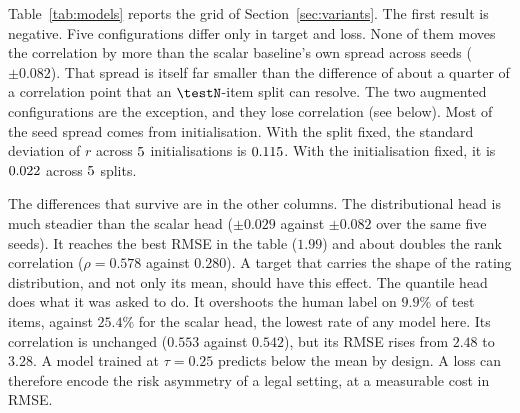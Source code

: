 \documentclass{BVP_JCLLT}
\newcommand{\rev}[1]{#1}
\newcommand{\rev}[1]{{\color{revcol}#1}}
\begin{document}
\rev{Table~\ref{tab:models} reports the grid of Section~\ref{sec:variants}. The
first result is negative. Five configurations differ only in
target and loss. None of them moves the correlation by more than the scalar
baseline's own spread across seeds ($\pm0.082$). That spread is itself far smaller than the
difference of about a quarter of a correlation point that an $\testN$-item split
can resolve. The two augmented configurations are the exception, and they lose
correlation (see below). Most of the seed spread comes from initialisation.
With the split fixed, the standard deviation of $r$ across
$5$ initialisations is $0.115$. With the initialisation fixed, it
is $0.022$ across $5$ splits.

The differences that survive are in the other columns. The distributional head
is much steadier than the scalar head ($\pm0.029$ against $\pm0.082$ over the
same five seeds). It reaches the best RMSE in the table ($1.99$) and about
doubles the rank correlation ($\rho=0.578$ against $0.280$). A target that
carries the shape of the rating distribution, and not only its mean, should
have this effect. The quantile head does what it was asked to do. It overshoots
the human label on $9.9\%$ of test items, against $25.4\%$ for the scalar head,
the lowest rate of any model here. Its correlation is unchanged ($0.553$ against
$0.542$), but its RMSE rises from $2.48$ to $3.28$. A model trained at
$\tau=0.25$ predicts below the mean by design. A loss can therefore encode the
risk asymmetry of a legal setting, at a measurable cost in RMSE.

}
\end{document}
